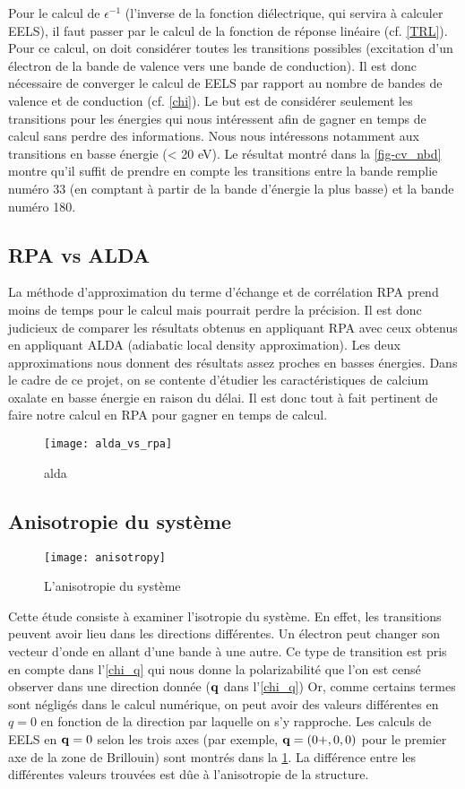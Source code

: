 Pour le calcul de $\epsilon^{-1}$ (l'inverse de la fonction diélectrique, qui servira à calculer EELS),
il faut passer par le calcul de la fonction de réponse linéaire (cf. \cref{TRL}).
Pour ce calcul, on doit considérer toutes les transitions possibles
(excitation d'un électron de la bande de valence vers une bande de conduction).
Il est donc nécessaire de converger le calcul de EELS par rapport au nombre de bandes de valence
et de conduction (cf. \cref{chi}).
Le but est de considérer seulement les transitions pour les énergies qui nous intéressent
afin de gagner en temps de calcul sans perdre des informations.
Nous nous intéressons notamment aux transitions en basse énergie (< 20 eV).
Le résultat montré dans la \cref{fig-cv_nbd} montre qu'il suffit de prendre en compte
les transitions entre la bande remplie numéro 33
(en comptant à partir de la bande d'énergie la plus basse) et la bande numéro 180.

\subsection{RPA vs ALDA}
La méthode d'approximation du terme d'échange et de corrélation RPA prend moins de temps
pour le calcul mais pourrait perdre la précision.
Il est donc judicieux de comparer les résultats obtenus en appliquant RPA avec ceux obtenus
en appliquant ALDA (adiabatic local density approximation).
Les deux approximations nous donnent des résultats assez proches en basses énergies.
Dans le cadre de ce projet, on se contente d'étudier les caractéristiques
de calcium oxalate en basse énergie en raison du délai.
Il est donc tout à fait pertinent de faire notre calcul en RPA pour gagner en temps de calcul.
\begin{figure}[!h]
    \centering
    \texttt{[image: alda\_vs\_rpa]}
    \caption{alda}
\end{figure}
\subsection{Anisotropie du système}

\begin{figure}[!h]\label{fig-anisotropie}
    \centering
    \texttt{[image: anisotropy]}
    \caption{L'anisotropie du système}
\end{figure}

Cette étude consiste à examiner l'isotropie du système.
En effet, les transitions peuvent avoir lieu dans les directions différentes.
Un électron peut changer son vecteur d'onde en allant d'une bande à une autre.
Ce type de transition est pris en compte dans l'\cref{chi_q} qui nous donne la polarizabilité
que l'on est censé observer dans une direction donnée ($\vb{q}$ dans l'\cref{chi_q})
Or, comme certains termes sont négligés dans le calcul numérique,
on peut avoir des valeurs différentes en $q = 0$ en fonction de la direction par laquelle on s'y rapproche.
Les calculs de EELS en $\vb{q} = 0$ selon les trois axes
(par exemple, $\vb{q}=(0+,0,0)$ pour le premier axe de la zone de Brillouin)
sont montrés dans la \cref{fig-anisotropie}.
La différence entre les différentes valeurs trouvées est dûe à l'anisotropie de la structure.
